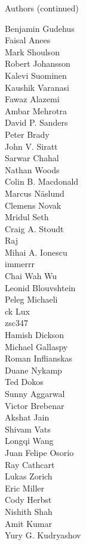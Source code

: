 \begin{frame}{Authors (continued)}
\begin{multicols}{5}
\tiny
Benjamin Gudehus\\
Faisal Anees\\
Mark Shoulson\\
Robert Johansson\\
Kalevi Suominen\\
Kaushik Varanasi\\
Fawaz Alazemi\\
Ambar Mehrotra\\
David P. Sanders\\
Peter Brady\\
John V. Siratt\\
Sarwar Chahal\\
Nathan Woods\\
Colin B. Macdonald\\
Marcus Näslund\\
Clemens Novak\\
Mridul Seth\\
Craig A. Stoudt\\
Raj\\
Mihai A. Ionescu\\
immerrr\\
Chai Wah Wu\\
Leonid Blouvshtein\\
Peleg Michaeli\\
ck Lux\\
zsc347\\
Hamish Dickson\\
Michael Gallaspy\\
Roman Inflianskas\\
Duane Nykamp\\
Ted Dokos\\
Sunny Aggarwal\\
Victor Brebenar\\
Akshat Jain\\
Shivam Vats\\
Longqi Wang\\
Juan Felipe Osorio\\
Ray Cathcart\\
Lukas Zorich\\
Eric Miller\\
Cody Herbst\\
Nishith Shah\\
Amit Kumar\\
Yury G. Kudryashov\\

\end{multicols}
\end{frame}
